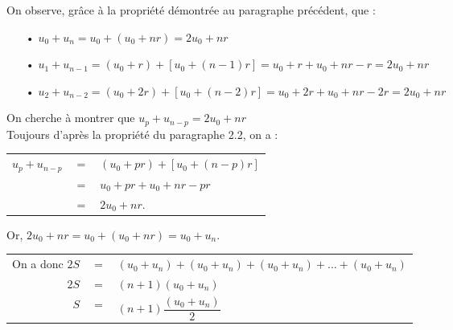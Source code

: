 \vspace*{.3cm}

On observe, grâce à la propriété démontrée au paragraphe précédent, que :  \\

\begin{itemize}
\item[•]$u_0 + u_n = u_0 + \left(u_0 + nr\right) = 2u_0 + nr$ \\
\item[•] $u_1 + u_{n-1} = \left(u_0 + r\right) + \left[u_0+\left(n-1\right)r\right] = u_0 + r + u_0 + nr - r = 2u_0 + nr$ \\ 
\item[•] $u_2 + u_{n-2} = \left(u_0 + 2r\right) + \left[u_0 + \left(n-2\right)r\right] = u_0 + 2r + u_0 + nr -2r = 2u_0 + nr$ \\
\end{itemize}

On cherche à montrer que $u_p + u_{n-p} = 2u_0 + nr$ \\

Toujours d'après la propriété du paragraphe 2.2, on a : \\

\begin{tabular}{lll}
$u_p + u_{n-p}$ & $ = $ & $ \left(u_0 + pr\right) + \left[u_0 + \left(n-p\right)r\right]$ \\
& $=$ & $u_0 + pr + u_0 + nr - pr$ \\
& $=$ & $2u_0 + nr$. \\
\end{tabular}

\vspace*{.3cm}

Or, $2u_0 + nr = u_0 + \left(u_0 + nr\right) =  u_0 + u_n$. \\ 

\begin{tabular}{rll}
On a donc $2S$ & $=$ & $\left(u_0 + u_n\right) + \left(u_0 + u_n\right) + \left(u_0 + u_n\right) + ... + \left(u_0 + u_n\right)$ \vspace*{.3cm} \\
$2S$ & $ = $ & $ \left(n+1\right)\left(u_0 + u_n\right)$ \vspace*{.3cm} \\
$S$ & $=$ & $\left(n+1\right)\dfrac{\left(u_0 + u_n\right)}{2}$ \vspace*{.3cm} \\
\end{tabular}

